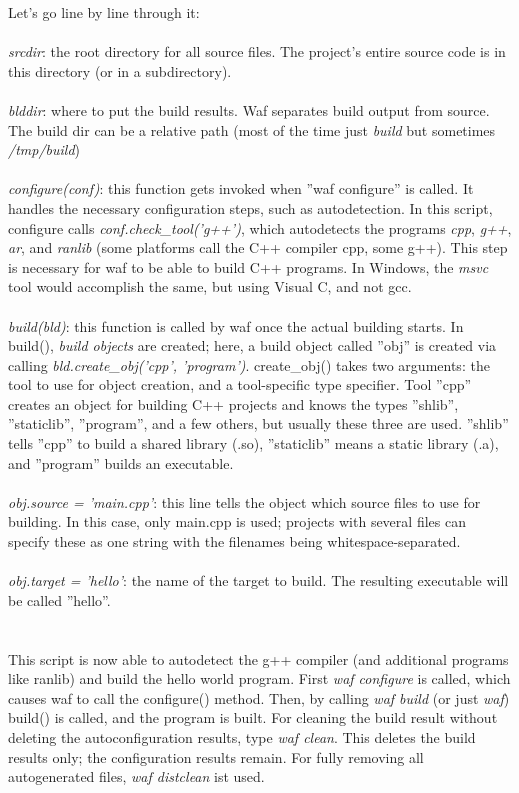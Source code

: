 \documentclass[a4,10pt]{article}
\begin{document}
Let's go line by line through it:\\
\\
\emph{srcdir}: the root directory for all source files. The project's entire source code is in this directory (or in a subdirectory).\\
\\
\emph{blddir}: where to put the build results. Waf separates build output from source. The build dir can be a relative path (most of the time just \emph{build} but sometimes \emph{/tmp/build})\\
\\
\emph{configure(conf)}: this function gets invoked when ''waf configure'' is called. It handles the necessary configuration steps, such as autodetection. In this script, configure calls \emph{conf.check\_tool('g++')}, which autodetects the programs \emph{cpp}, \emph{g++}, \emph{ar}, and \emph{ranlib} (some platforms call the C++ compiler cpp, some g++). This step is necessary for waf to be able to build C++ programs. In Windows, the \emph{msvc} tool would accomplish the same, but using Visual C, and not gcc.\\
\\
\emph{build(bld)}: this function is called by waf once the actual building starts.
In build(), \emph{build objects} are created; here, a build object called ''obj'' is created via calling \emph{bld.create\_obj('cpp', 'program')}. create\_obj() takes two arguments: the tool to use for object creation, and a tool-specific type specifier. Tool ''cpp'' creates an object for building C++ projects and knows the types ''shlib'', ''staticlib'', ''program'', and a few others, but usually these three are used. ''shlib'' tells ''cpp'' to build a shared library (.so), ''staticlib'' means a static library (.a), and ''program'' builds an executable.\\
\\
\emph{obj.source = 'main.cpp'}: this line tells the object which source files to use for building. In this case, only main.cpp is used; projects with several files can specify these as one string with the filenames being whitespace-separated.\\
\\
\emph{obj.target = 'hello'}: the name of the target to build. The resulting executable will be called ''hello''.\\\\
\\
This script is now able to autodetect the g++ compiler (and additional programs like ranlib) and build the hello world program. First \emph{waf configure} is called, which causes waf to call the configure() method. Then, by calling \emph{waf build} (or just \emph{waf}) build() is called, and the program is built. For cleaning the build result without deleting the autoconfiguration results, type \emph{waf clean}. This deletes the build results only; the configuration results remain. For fully removing all autogenerated files, \emph{waf distclean} ist used.
\end{document}
